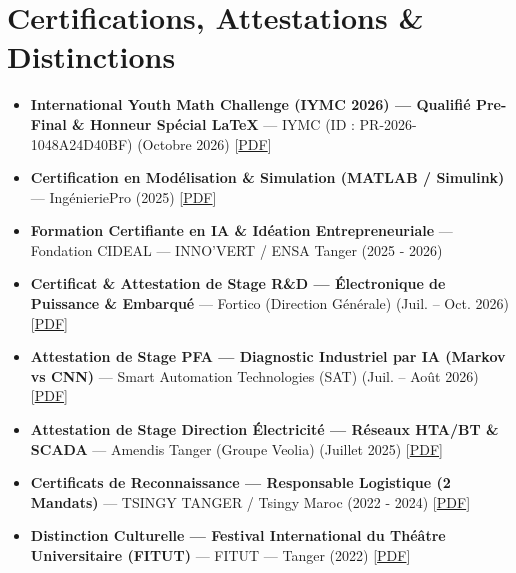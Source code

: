 \documentclass[10pt,a4paper]{article}
\begin{document}
\section*{Certifications, Attestations \& Distinctions}
\begin{itemize}
\item \textbf{International Youth Math Challenge (IYMC 2026) --- Qualifié Pre-Final \& Honneur Spécial LaTeX} --- IYMC (ID : PR-2026-1048A24D40BF) (Octobre 2026) [\href{https://scidelo-andriasahy.github.io/assets/pdfs/Certificat_IYMC_2026.pdf}{PDF}]
\item \textbf{Certification en Modélisation \& Simulation (MATLAB / Simulink)} --- IngénieriePro (2025) [\href{https://scidelo-andriasahy.github.io/assets/pdfs/CertificatMatlab.pdf}{PDF}]
\item \textbf{Formation Certifiante en IA \& Idéation Entrepreneuriale} --- Fondation CIDEAL --- INNO'VERT / ENSA Tanger (2025 - 2026)
\item \textbf{Certificat \& Attestation de Stage R\&D --- Électronique de Puissance \& Embarqué} --- Fortico (Direction Générale) (Juil. -- Oct. 2026) [\href{https://scidelo-andriasahy.github.io/assets/pdfs/Certificat_Stage_Fortico.pdf}{PDF}]
\item \textbf{Attestation de Stage PFA --- Diagnostic Industriel par IA (Markov vs CNN)} --- Smart Automation Technologies (SAT) (Juil. -- Août 2026) [\href{https://scidelo-andriasahy.github.io/assets/pdfs/Attestation_Stage_PFA_SAT.pdf}{PDF}]
\item \textbf{Attestation de Stage Direction Électricité --- Réseaux HTA/BT \& SCADA} --- Amendis Tanger (Groupe Veolia) (Juillet 2025) [\href{https://scidelo-andriasahy.github.io/assets/pdfs/Attestation_Stage_Amendis.pdf}{PDF}]
\item \textbf{Certificats de Reconnaissance --- Responsable Logistique (2 Mandats)} --- TSINGY TANGER / Tsingy Maroc (2022 - 2024) [\href{https://scidelo-andriasahy.github.io/assets/pdfs/CertificatTsingyTanger1ereMandat.pdf}{PDF}]
\item \textbf{Distinction Culturelle --- Festival International du Théâtre Universitaire (FITUT)} --- FITUT --- Tanger (2022) [\href{https://scidelo-andriasahy.github.io/assets/pdfs/CertificatFITUT.pdf}{PDF}]
\end{itemize}
\end{document}
